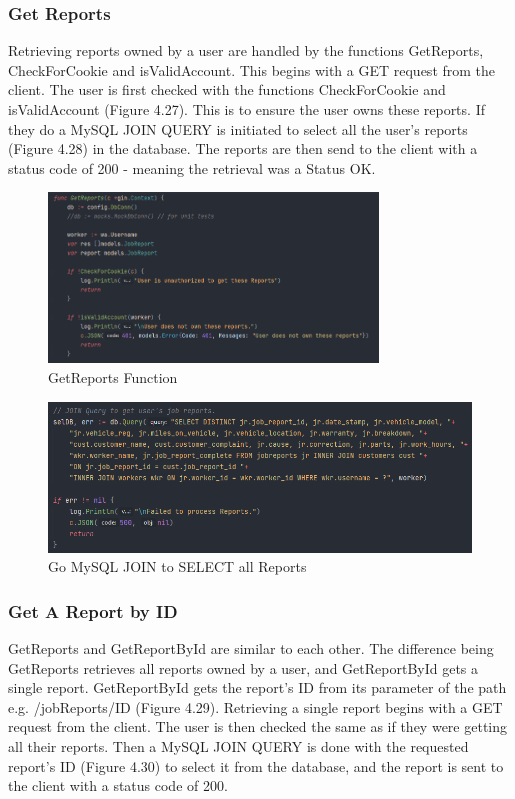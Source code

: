\subsubsection{Get Reports}
Retrieving reports owned by a user are handled by the functions GetReports, CheckForCookie and isValidAccount. This begins with a GET request from the client. The user is first checked with the functions CheckForCookie and isValidAccount (Figure 4.27). This is to ensure the user owns these reports. If they do a MySQL JOIN QUERY is initiated to select all the user's reports (Figure 4.28) in the database. The reports are then send to the client with a status code of 200 - meaning the retrieval was a Status OK.

\begin{figure}[H]
    \caption{GetReports Function}
    \label{image:getReports}
    \centering
    \includegraphics[width=0.78\textwidth]{images/horton/report_system/get_reports.png}
\end{figure}

\begin{figure}[H]
    \caption{Go MySQL JOIN to SELECT all Reports}
    \label{image:go_mysql_join}
    \centering
    \includegraphics[width=1.0\textwidth]{images/horton/report_system/go_mysql_join.png}
\end{figure}

\subsubsection{Get A Report by ID}
GetReports and GetReportById are similar to each other. The difference being GetReports retrieves all reports owned by a user, and GetReportById gets a single report. GetReportById gets the report's ID from its parameter of the path e.g. /jobReports/ID (Figure 4.29). Retrieving a single report begins with a GET request from the client. The user is then checked the same as if they were getting all their reports. Then a MySQL JOIN QUERY is done with the requested report's ID (Figure 4.30) to select it from the database, and the report is sent to the client with a status code of 200.

